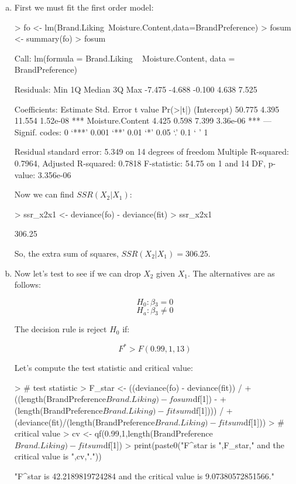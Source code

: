 \documentclass{article}
\begin{document}
\begin{enumerate}[a)]
\item{} First we must fit the first order model:

\begin{Schunk}
\begin{Sinput}
> fo <- lm(Brand.Liking~Moisture.Content,data=BrandPreference)
> fosum <- summary(fo)
> fosum
\end{Sinput}
\begin{Soutput}
Call:
lm(formula = Brand.Liking ~ Moisture.Content, data = BrandPreference)

Residuals:
   Min     1Q Median     3Q    Max 
-7.475 -4.688 -0.100  4.638  7.525 

Coefficients:
                 Estimate Std. Error t value Pr(>|t|)    
(Intercept)        50.775      4.395  11.554 1.52e-08 ***
Moisture.Content    4.425      0.598   7.399 3.36e-06 ***
---
Signif. codes:  0 ‘***’ 0.001 ‘**’ 0.01 ‘*’ 0.05 ‘.’ 0.1 ‘ ’ 1

Residual standard error: 5.349 on 14 degrees of freedom
Multiple R-squared:  0.7964,	Adjusted R-squared:  0.7818 
F-statistic: 54.75 on 1 and 14 DF,  p-value: 3.356e-06
\end{Soutput}
\end{Schunk}

Now we can find $SSR(X_2|X_1)$:

\begin{Schunk}
\begin{Sinput}
> ssr_x2x1 <- deviance(fo) - deviance(fit)
> ssr_x2x1
\end{Sinput}
\begin{Soutput}
[1] 306.25
\end{Soutput}
\end{Schunk}

So, the extra sum of squares, $SSR(X_2|X_1) = 306.25$.

\item{} Now let's test to see if we can drop $X_2$ given $X_1$. The alternatives are as follows:

$$ H_0: \beta{}_3 = 0 $$
$$ H_a: \beta{}_3 \neq{} 0 $$

The decision rule is reject $H_0$ if:

$$ F^* > F(0.99,1,13) $$

Let's compute the test statistic and critical value:

\begin{Schunk}
\begin{Sinput}
> # test statistic
> F_star <- ((deviance(fo) - deviance(fit)) /
+   ((length(BrandPreference$Brand.Liking) - fosum$df[1]) - 
+      (length(BrandPreference$Brand.Liking) - fitsum$df[1]))) /
+   (deviance(fit)/(length(BrandPreference$Brand.Liking) - fitsum$df[1]))
> # critical value
> cv <- qf(0.99,1,length(BrandPreference$Brand.Liking)-fitsum$df[1])
> print(paste0("F^star is ",F_star," and the critical value is ",cv,"."))
\end{Sinput}
\begin{Soutput}
[1] "F^star is 42.2189819724284 and the critical value is 9.07380572851566."
\end{Soutput}
\end{Schunk}


\end{enumerate}
\end{document}
